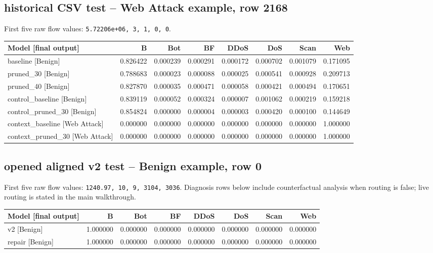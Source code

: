 \documentclass[11pt,a4paper,oneside]{report}
\newcommand{\code}[1]{\nolinkurl{#1}}
\begin{document}
\subsection{historical CSV test -- Web Attack example, row 2168}
First five raw flow values: \code{5.72206e+06, 3, 1, 0, 0}.

{\small
\begin{longtable}{@{}p{}rrrrrrr@{}}
\toprule
Model [final output] & B & Bot & BF & DDoS & DoS & Scan & Web\\\midrule\endhead
baseline [Benign] & 0.826422 & 0.000239 & 0.000291 & 0.000172 & 0.000702 & 0.001079 & 0.171095\\
pruned\_30 [Benign] & 0.788683 & 0.000023 & 0.000088 & 0.000025 & 0.000541 & 0.000928 & 0.209713\\
pruned\_40 [Benign] & 0.827870 & 0.000035 & 0.000471 & 0.000058 & 0.000421 & 0.000494 & 0.170651\\
control\_baseline [Benign] & 0.839119 & 0.000052 & 0.000324 & 0.000007 & 0.001062 & 0.000219 & 0.159218\\
control\_pruned\_30 [Benign] & 0.854824 & 0.000000 & 0.000004 & 0.000003 & 0.000420 & 0.000100 & 0.144649\\
context\_baseline [Web Attack] & 0.000000 & 0.000000 & 0.000000 & 0.000000 & 0.000000 & 0.000000 & 1.000000\\
context\_pruned\_30 [Web Attack] & 0.000000 & 0.000000 & 0.000000 & 0.000000 & 0.000000 & 0.000000 & 1.000000\\
\bottomrule\end{longtable}
}

\subsection{opened aligned v2 test -- Benign example, row 0}
First five raw flow values: \code{1240.97, 10, 9, 3104, 3036}.
Diagnosis rows below include counterfactual analysis when routing is false; live routing is stated in the main walkthrough.

{\small
\begin{longtable}{@{}p{}rrrrrrr@{}}
\toprule
Model [final output] & B & Bot & BF & DDoS & DoS & Scan & Web\\\midrule\endhead
v2 [Benign] & 1.000000 & 0.000000 & 0.000000 & 0.000000 & 0.000000 & 0.000000 & 0.000000\\
repair [Benign] & 1.000000 & 0.000000 & 0.000000 & 0.000000 & 0.000000 & 0.000000 & 0.000000\\
\bottomrule\end{longtable}
}
\end{document}
